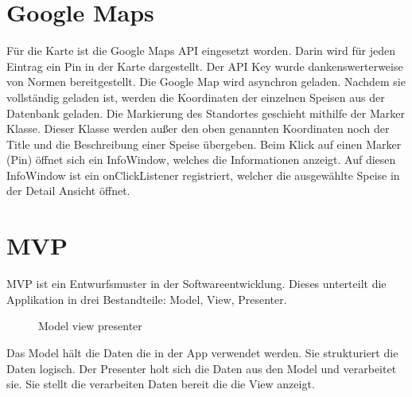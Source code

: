 \documentclass[
    DIV12,
    cleardouble=plain,
    headings=normal,
    pdftex,
    headexclude,footexclude,
    final
]{scrreprt}
\begin{document}



\section{Google Maps}
Für die Karte ist die Google Maps API eingesetzt worden. Darin wird für jeden Eintrag ein Pin in der Karte dargestellt.
Der API Key wurde dankenswerterweise von Normen bereitgestellt.
Die Google Map wird asynchron geladen. Nachdem sie vollständig geladen ist, werden die Koordinaten der einzelnen Speisen aus der Datenbank geladen. Die Markierung des Standortes geschieht mithilfe der Marker Klasse. Dieser Klasse werden außer den oben genannten Koordinaten noch der Title und die Beschreibung einer Speise übergeben. Beim Klick auf einen Marker (Pin) öffnet sich ein 
InfoWindow, welches die Informationen anzeigt. Auf diesen InfoWindow ist ein onClickListener registriert, welcher die ausgewählte Speise in der Detail Ansicht öffnet.


\newpage

\section{MVP}
MVP ist ein Entwurfsmuster in der Softwareentwicklung.  Dieses unterteilt die Applikation in drei Bestandteile: Model, View, Presenter.\\


\begin{figure}[H]
		\centering
		\caption{Model view presenter}
	\label{MVP}
\end{figure}
	

Das Model hält die Daten die in der App verwendet werden. Sie strukturiert die Daten logisch. Der Presenter holt sich die Daten aus den Model und verarbeitet sie. Sie stellt die verarbeiten Daten bereit die die View anzeigt.

\newpage
\end{document}
